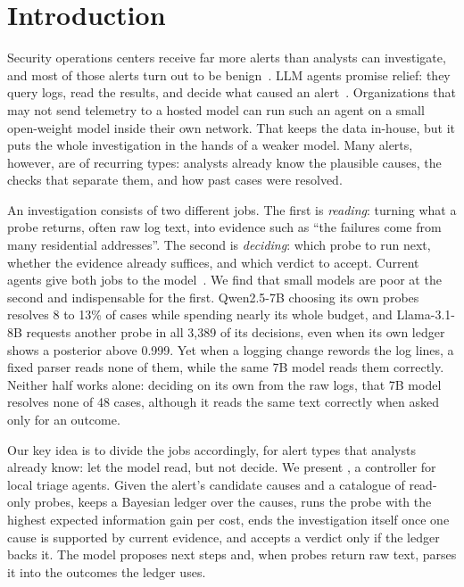 \section{Introduction}
\label{sec:intro}

Security operations centers receive far more alerts than analysts can investigate, and most of those alerts turn out to be benign~\citep{nodoze}. LLM agents promise relief: they query logs, read the results, and decide what caused an alert~\citep{excytin,clouseau}. Organizations that may not send telemetry to a hosted model can run such an agent on a small open-weight model inside their own network. That keeps the data in-house, but it puts the whole investigation in the hands of a weaker model. Many alerts, however, are of recurring types: analysts already know the plausible causes, the checks that separate them, and how past cases were resolved.

An investigation consists of two different jobs. The first is \emph{reading}: turning what a probe returns, often raw log text, into evidence such as ``the failures come from many residential addresses''. The second is \emph{deciding}: which probe to run next, whether the evidence already suffices, and which verdict to accept. Current agents give both jobs to the model~\citep{react}. We find that small models are poor at the second and indispensable for the first. Qwen2.5-7B choosing its own probes resolves 8 to 13\% of cases while spending nearly its whole budget, and Llama-3.1-8B requests another probe in all 3{,}389 of its decisions, even when its own ledger shows a posterior above 0.999. Yet when a logging change rewords the log lines, a fixed parser reads none of them, while the same 7B model reads them correctly. Neither half works alone: deciding on its own from the raw logs, that 7B model resolves none of 48 cases, although it reads the same text correctly when asked only for an outcome.

Our key idea is to divide the jobs accordingly, for alert types that analysts already know: let the model read, but not decide. We present \hesp{}, a controller for local triage agents. Given the alert's candidate causes and a catalogue of read-only probes, \hesp{} keeps a Bayesian ledger over the causes, runs the probe with the highest expected information gain per cost, ends the investigation itself once one cause is supported by current evidence, and accepts a verdict only if the ledger backs it. The model proposes next steps and, when probes return raw text, parses it into the outcomes the ledger uses.

